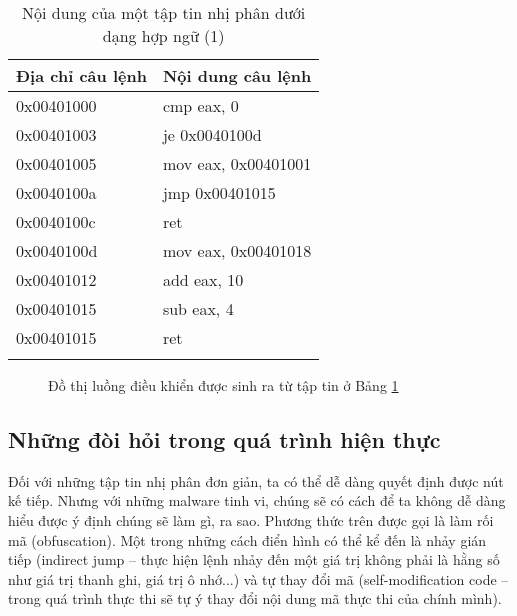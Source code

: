 \begin{longtable}{ | m{3cm} | m{5cm} | }
	\hline
Địa chỉ câu lệnh & Nội dung câu lệnh\\
	\hline
	\hline
0x00401000 & cmp eax, 0 \\
	\hline
0x00401003	& je 0x0040100d \\
	\hline
0x00401005 & mov eax, 0x00401001 \\
	\hline
0x0040100a & jmp 0x00401015 \\
	\hline
0x0040100c & ret \\
	\hline
0x0040100d & mov eax, 0x00401018 \\
	\hline
0x00401012 & add eax, 10 \\
	\hline
0x00401015 & sub eax, 4 \\
	\hline
0x00401015 & ret \\
	\hline

\caption{Nội dung của một tập tin nhị phân dưới dạng hợp ngữ (1)}
\label{table:tblexcfg}
\end{longtable}

\begin{figure}[H]
\centering
{}
\caption{Đồ thị luồng điều khiển được sinh ra từ tập tin ở Bảng \ref {table:tblexcfg}} 
\label{fig:imgexcfg}
\end{figure}


	\subsection{Những đòi hỏi trong quá trình hiện thực}

Đối với những tập tin nhị phân đơn giản, ta có thể dễ dàng quyết định được nút kế tiếp. Nhưng với những malware tinh vi, chúng sẽ có cách để ta không dễ dàng hiểu được ý định chúng sẽ làm gì, ra sao. Phương thức trên được gọi là làm rối mã (obfuscation). Một trong những cách điển hình có thể kể đến là nhảy gián tiếp (indirect jump -- thực hiện lệnh nhảy đến một giá trị không phải là hằng số như giá trị thanh ghi, giá trị ô nhớ...) và tự thay đổi mã (self-modification code -- trong quá trình thực thi sẽ tự ý thay đổi nội dung mã thực thi của chính mình).\\

